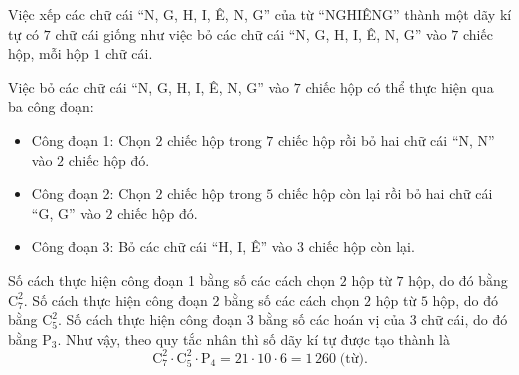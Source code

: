 \begin{bt}
{\begin{enumerate}
			Việc xếp các chữ cái ``N, G, H, I, Ê, N, G'' của từ ``NGHIÊNG'' thành một dãy kí tự có $7$ chữ cái giống như việc bỏ các chữ cái ``N, G, H, I, Ê, N, G'' vào $7$ chiếc hộp, mỗi hộp $1$ chữ cái.
			\begin{center}
			\end{center}
			Việc bỏ các chữ cái ``N, G, H, I, Ê, N, G'' vào $7$ chiếc hộp có thể thực hiện qua ba công đoạn:
			\begin{itemize}
				\item Công đoạn 1: Chọn $2$ chiếc hộp trong $7$ chiếc hộp rồi bỏ hai chữ cái ``N, N'' vào $2$ chiếc hộp đó.
				\item Công đoạn 2: Chọn $2$ chiếc hộp trong $5$ chiếc hộp còn lại rồi bỏ hai chữ cái ``G, G'' vào $2$ chiếc hộp đó.
				\item Công đoạn 3: Bỏ các chữ cái ``H, I, Ê'' vào $3$ chiếc hộp còn lại.
			\end{itemize}
			Số cách thực hiện công đoạn 1 bằng số các cách chọn $2$ hộp từ $7$ hộp, do đó bằng $\mathrm{C}^{2}_{7}$. Số cách thực hiện công đoạn 2 bằng số các cách chọn $2$ hộp từ $5$ hộp, do đó bằng $\mathrm{C}^{2}_{5}$. Số cách thực hiện công đoạn 3 bằng số các hoán vị của $3$ chữ cái, do đó bằng $\mathrm{P}_{3}$. Như vậy, theo quy tắc nhân thì số dãy kí tự được tạo thành là
			$$\mathrm{C}^{2}_{7}\cdot\mathrm{C}^{2}_{5}\cdot\mathrm{P}_{4}=21\cdot 10\cdot 6=1\,260\;\text{(từ)}.$$
		\end{enumerate}
	}
\end{bt}

